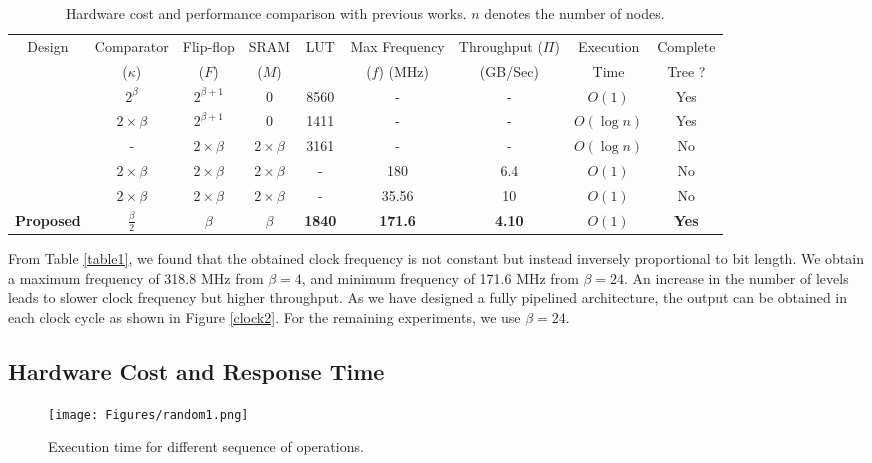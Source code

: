 \documentclass[10pt, conference, compsocconf]{IEEEtran}
\begin{document}
\begin{table}
 \begin{center}
 \caption{Hardware cost and performance comparison with previous works. $n$ denotes the number of nodes.}
\label{table4}
\begin{tabular}{ |c|c|c|c|c|c|c|c|c| }
 \hline
 Design  & Comparator  & Flip-flop & SRAM & LUT &Max Frequency & Throughput ($\Pi$) & Execution & Complete \\
  & ($\kappa$)& ($F$)& ($M$) &  & ($f$) (MHz) & (GB/Sec) & Time & Tree ?\\
 \hline
 \hline
 \cite{hw8} & $2^\beta$ & $2^{\beta +1}$& 0 & 8560 & - & - & $O(1)$ & Yes\\
 \hline
 \cite{hw11} & $2 \times \beta$ & $2^{\beta +1}$ & 0 & 1411 & - & - & $O(\log n)$ & Yes\\
 \hline
 \cite{hwsw1} & - & $2 \times \beta$ & $2 \times \beta$ & 3161 & - & - & $O(\log n)$ & No\\
 \hline
 \cite{fpga1} & $2 \times \beta$ & $2 \times \beta$ & $2 \times \beta$ & - & 180 &6.4 & $O(1)$ & No\\
 \hline
 \cite{hw2} & $2 \times \beta$ & $2 \times \beta$ & $2 \times \beta$ & - & 35.56 &10 & $O(1)$ & No\\
 \hline 
{\bf Proposed} & {\bf $\frac{\beta}{2}$} & {\bf $\beta$} & {\bf $\beta$} & {\bf 1840} & {\bf 171.6} & {\bf 4.10} & {\bf $O(1)$} & {\bf Yes}\\
 \hline
\end{tabular}
\end{center}
\end{table}

From Table \ref{table1}, we found that the obtained clock frequency is not constant but instead inversely proportional to bit length.
We obtain a maximum frequency of 318.8 MHz from $\beta = 4$, and minimum frequency of 171.6 MHz from $\beta = 24$.
An increase in the number of levels leads to slower clock frequency but higher throughput.
As we have designed a fully pipelined architecture, the output can be obtained in each clock cycle as shown in Figure \ref{clock2}.
For the remaining experiments, we use $\beta = 24$.

\subsection{Hardware Cost and Response Time}

\begin{figure}[!ht]
  \centering
  \texttt{[image: Figures/random1.png]}
      \caption{Execution time for different sequence of operations.}
    \label{random}
\end{figure}
\end{document}
